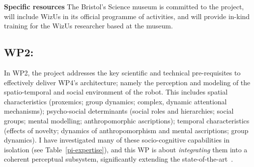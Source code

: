 \documentclass[11pt,a4paper]{report}
\newcommand{\project}{WizUs\xspace}
\begin{document}
\textbf{Specific resources} The Bristol's Science museum is committed to the
project, will include \project in its official programme of activities, and will
provide in-kind training for the \project researcher based at the museum.

% 
% 
% 
% 
% 
% 
% 
% 
% 



\subsection{WP2: \textbf{\wpTwo}}


In WP2, the project addresses the key scientific and technical pre-requisites to
effectively deliver WP4's architecture; namely the perception and modeling of
the spatio-temporal and social environment of the robot. This includes spatial
characteristics (proxemics; group dynamics; complex, dynamic attentional
mechanisms); psycho-social determinants (social roles and hierarchies; social
groups; mental modelling; anthropomorphic ascriptions); temporal characteristics
(effects of novelty; dynamics of anthropomorphism and mental ascriptions; group
dynamics). I have investigated many of these socio-cognitive capabilities in
isolation (see Table~\ref{pi-expertise}), and this WP is about
\emph{integrating} them into a coherent perceptual subsystem, significantly
extending the state-of-the-art~\cite{lemaignan2017artificial, baxter2016cognitive}.
\end{document}
